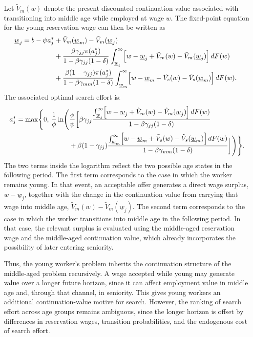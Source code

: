\documentclass{article}
\newcommand{\lbar}[1]{\underline{#1}} %
\begin{document}
Let $\tilde V_m(w)$ denote the present discounted continuation value associated with transitioning into middle age while employed at wage $w$. The fixed-point equation for the young reservation wage can then be written as
\begin{align}
\lbar{w}_j
=
b-\psi a_j^*
&+\tilde V_m(\lbar w_m)-\tilde V_m(\lbar w_j)
\nonumber\\
&+\frac{\beta\gamma_{jj}\pi(a_j^*)}
{1-\beta\gamma_{jj}(1-\delta)}
\int_{\lbar{w}_j}^{\infty}
\Bigl[
w-\lbar{w}_j+\tilde V_m(w)-\tilde V_m(\lbar{w}_j)
\Bigr]\,dF(w)
\nonumber\\
&+\frac{\beta(1-\gamma_{jj})\pi(a_j^*)}
{1-\beta\gamma_{mm}(1-\delta)}
\int_{\lbar{w}_m}^{\infty}
\Bigl[
w-\lbar{w}_m+\tilde V_s(w)-\tilde V_s(\lbar{w}_m)
\Bigr]\,dF(w).
~\label{eq:wj_fixed_point}
\end{align}
The associated optimal search effort is:
\begin{align}
a_j^*
=
\max\Biggl\{
0,\,
\frac{1}{\phi}
\ln\Biggl(
&\frac{\phi}{\psi}
\biggl[
\beta\gamma_{jj}\frac{\int_{\lbar{w}_j}^{\infty}
\Bigl[
w-\lbar{w}_j+\tilde V_m(w)-\tilde V_m(\lbar{w}_j)
\Bigr]\,dF(w)}
{1-\beta\gamma_{jj}(1-\delta)}
\nonumber\\
&+
\beta(1-\gamma_{jj})\frac{\int_{\lbar{w}_m}^{\infty}
\Bigl[
w-\lbar{w}_m+\tilde V_s(w)-\tilde V_s(\lbar{w}_m)
\Bigr]\,dF(w)}
{1-\beta\gamma_{mm}(1-\delta)}
\biggr]
\Biggr)
\Biggr\}.
\label{eq:aj_star}
\end{align}
The two terms inside the logarithm reflect the two possible age states in the following period. The first term corresponds to the case in which the worker remains young. In that event, an acceptable offer generates a direct wage surplus, $w-\lbar w_j$, together with the change in the continuation value from carrying that wage into middle age, $\tilde V_m(w)-\tilde V_m(\lbar w_j)$. The second term corresponds to the case in which the worker transitions into middle age in the following period. In that case, the relevant surplus is evaluated using the middle-aged reservation wage and the middle-aged continuation value, which already incorporates the possibility of later entering seniority.

Thus, the young worker's problem inherits the continuation structure of the middle-aged problem recursively. A wage accepted while young may generate value over a longer future horizon, since it can affect employment value in middle age and, through that channel, in seniority. This gives young workers an additional continuation-value motive for search. However, the ranking of search effort across age groups remains ambiguous, since the longer horizon is offset by differences in reservation wages, transition probabilities, and the endogenous cost of search effort.
\end{document}
